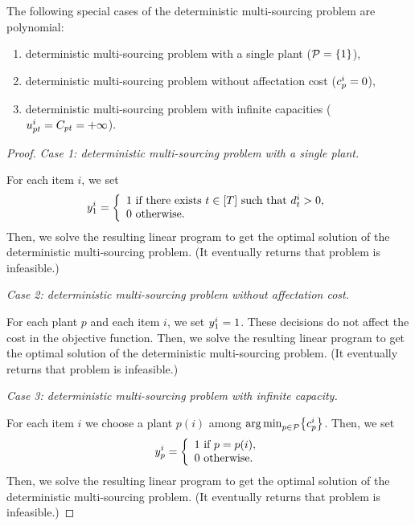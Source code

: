 \begin{prop}\label{prop:deterministic-multi-sourcing:polynomial-cases}
The following special cases of the deterministic multi-sourcing problem are polynomial:
\begin{enumerate}
  \item deterministic multi-sourcing problem with a single plant ($\plants=\crbracket{1}$),
  \item deterministic multi-sourcing problem without affectation cost ($c_p^i=0$),
  \item deterministic multi-sourcing problem with infinite capacities ($u_{pt}^i=C_{pt}=+\infty$).
\end{enumerate}
\end{prop}


\begin{proof}
\emph{Case 1: deterministic multi-sourcing problem with a single plant.}

For each item $i$, we set
$$
\open_1^i=
\left\{
\begin{array}{l}
1\mbox{ if there exists }t\in\range{\horizon}\mbox{ such that }\demand_t^i>0,\\
0\mbox{ otherwise}.
\end{array}
\right.
$$
Then, we solve the resulting linear program to get the optimal solution of the deterministic multi-sourcing problem.
(It eventually returns that problem is infeasible.)

\medskip

\emph{Case 2: deterministic multi-sourcing problem without affectation cost.}

For each plant $p$ and each item $i$, we set $y_1^i=1$.
These decisions do not affect the cost in the objective function.
Then, we solve the resulting linear program to get the optimal solution of the deterministic multi-sourcing problem.
(It eventually returns that problem is infeasible.)

\medskip

\emph{Case 3: deterministic multi-sourcing problem with infinite capacity.}

For each item $i$ we choose a plant $p(i)$ among $\argmin_{p\in\plants}\crbracket{\affect_p^i}$.
Then, we set
$$
\open_p^i=
\left\{
\begin{array}{l}
1\mbox{ if }p=p(i),\\
0\mbox{ otherwise}.
\end{array}
\right.
$$
Then, we solve the resulting linear program to get the optimal solution of the deterministic multi-sourcing problem.
(It eventually returns that problem is infeasible.)
\end{proof}
